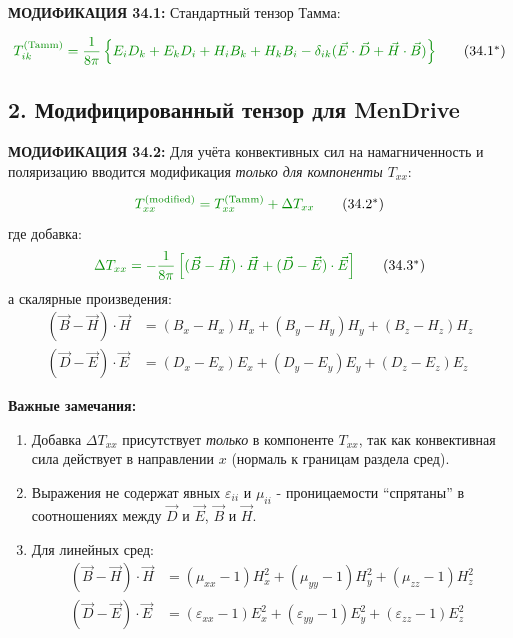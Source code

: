 \documentclass[a4paper,12pt]{article}
\newcommand{\modtext}[1]{\textcolor{modcolor}{#1}}
\newcommand{\modmath}[1]{\textcolor{modcolor}{#1}}
\newcommand{\modblock}[1]{\colorbox{modcolor!10}{\parbox{\dimexpr\linewidth-2\fboxsep}{#1}}}
\begin{document}
\modtext{
\textbf{МОДИФИКАЦИЯ 34.1:} Стандартный тензор Тамма:
}

\modblock{
\modtext{
\begin{equation}
\modmath{
T_{ik}^{\text{(Tamm)}} = \frac{1}{8\pi}\left\{
E_i D_k + E_k D_i + H_i B_k + H_k B_i -
\delta_{ik}(\vec{E}\cdot\vec{D} + \vec{H}\cdot\vec{B})
\right\}
}
\tag{34.1$^*$}
\end{equation}
}
}

\subsection*{2. Модифицированный тензор для MenDrive}

\modtext{
\textbf{МОДИФИКАЦИЯ 34.2:} Для учёта конвективных сил на намагниченность
и поляризацию вводится модификация \textit{только для компоненты $T_{xx}$}:
}

\begin{equation}
\modmath{
T_{xx}^{\text{(modified)}} = T_{xx}^{\text{(Tamm)}} + \Delta T_{xx}
}
\tag{34.2$^*$}
\end{equation}
где добавка:
\begin{equation}
\modmath{
\Delta T_{xx} = -\frac{1}{8\pi}\left[
(\vec{B}-\vec{H})\cdot\vec{H} +
(\vec{D}-\vec{E})\cdot\vec{E}
\right]
}
\tag{34.3$^*$}
\end{equation}
а скалярные произведения:
\begin{align}
(\vec{B}-\vec{H})\cdot\vec{H} &=
(B_x - H_x)H_x + (B_y - H_y)H_y + (B_z - H_z)H_z \\
(\vec{D}-\vec{E})\cdot\vec{E} &=
(D_x - E_x)E_x + (D_y - E_y)E_y + (D_z - E_z)E_z
\end{align}

\textbf{Важные замечания:}
\begin{enumerate}
    \item Добавка $\Delta T_{xx}$ присутствует \textit{только} в компоненте
    $T_{xx}$, так как конвективная сила действует в направлении $x$
    (нормаль к границам раздела сред).

    \item Выражения не содержат явных $\varepsilon_{ii}$ и $\mu_{ii}$ -
    проницаемости ``спрятаны'' в соотношениях между $\vec{D}$ и $\vec{E}$,
    $\vec{B}$ и $\vec{H}$.

    \item Для линейных сред:
    \begin{align}
    (\vec{B}-\vec{H})\cdot\vec{H} &=
    (\mu_{xx}-1)H_x^2 + (\mu_{yy}-1)H_y^2 + (\mu_{zz}-1)H_z^2 \\
    (\vec{D}-\vec{E})\cdot\vec{E} &=
    (\varepsilon_{xx}-1)E_x^2 + (\varepsilon_{yy}-1)E_y^2 +
    (\varepsilon_{zz}-1)E_z^2
    \end{align}
\end{enumerate}
\end{document}

